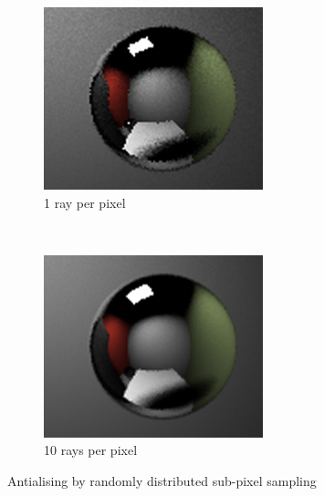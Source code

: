 \documentclass[a4paper, 12pt]{report}
\begin{document}
\begin{figure}
        \centering
        \begin{subfigure}[b]{0.3\textwidth}
                \includegraphics[width=\textwidth]{figures/aliasing_1.png}
                \caption{1 ray per pixel}
                \label{fig:aliasing1}
        \end{subfigure}%
        ~ %
        \begin{subfigure}[b]{0.3\textwidth}
                \includegraphics[width=\textwidth]{figures/aliasing_10.png}
                \caption{10 rays per pixel}
                \label{fig:aliasing10}
        \end{subfigure}
        \caption{Antialising by randomly distributed sub-pixel sampling}\label{fig:antialiasing}
\end{figure}
\end{document}
